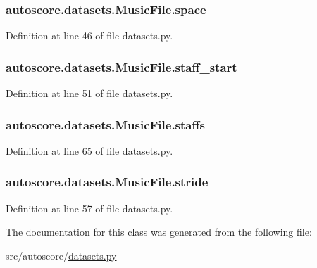 \subsubsection[{\texorpdfstring{space}{space}}]{\setlength{\rightskip}{0pt plus 5cm}autoscore.\+datasets.\+Music\+File.\+space}\hypertarget{classautoscore_1_1datasets_1_1MusicFile_af4e09b923bdd5383d414bb98352aa462}{}\label{classautoscore_1_1datasets_1_1MusicFile_af4e09b923bdd5383d414bb98352aa462}


Definition at line 46 of file datasets.\+py.

\subsubsection[{\texorpdfstring{staff\+\_\+start}{staff_start}}]{\setlength{\rightskip}{0pt plus 5cm}autoscore.\+datasets.\+Music\+File.\+staff\+\_\+start}\hypertarget{classautoscore_1_1datasets_1_1MusicFile_aa0496558ca272cd757c35daf4d790c02}{}\label{classautoscore_1_1datasets_1_1MusicFile_aa0496558ca272cd757c35daf4d790c02}


Definition at line 51 of file datasets.\+py.

\subsubsection[{\texorpdfstring{staffs}{staffs}}]{\setlength{\rightskip}{0pt plus 5cm}autoscore.\+datasets.\+Music\+File.\+staffs}\hypertarget{classautoscore_1_1datasets_1_1MusicFile_a7e6bd78a57ca8d50ffc47351c6126c41}{}\label{classautoscore_1_1datasets_1_1MusicFile_a7e6bd78a57ca8d50ffc47351c6126c41}


Definition at line 65 of file datasets.\+py.

\subsubsection[{\texorpdfstring{stride}{stride}}]{\setlength{\rightskip}{0pt plus 5cm}autoscore.\+datasets.\+Music\+File.\+stride}\hypertarget{classautoscore_1_1datasets_1_1MusicFile_a2b86ffd7e820dba00ece053745db27cb}{}\label{classautoscore_1_1datasets_1_1MusicFile_a2b86ffd7e820dba00ece053745db27cb}


Definition at line 57 of file datasets.\+py.



The documentation for this class was generated from the following file\+:\begin{DoxyCompactItemize}
\item 
src/autoscore/\hyperlink{datasets_8py}{datasets.\+py}\end{DoxyCompactItemize}
